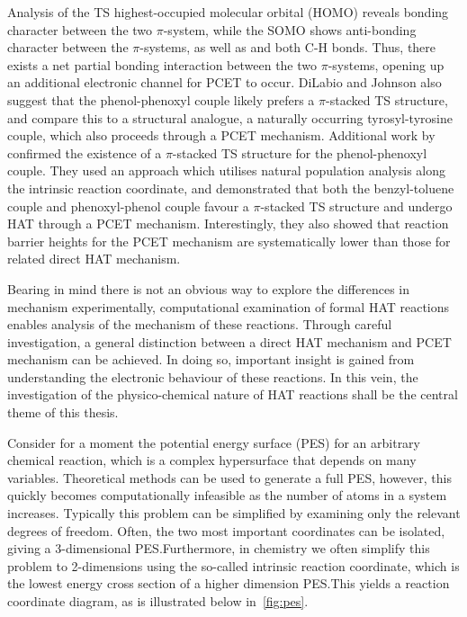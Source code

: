 Analysis of the TS highest-occupied molecular orbital (HOMO) reveals bonding character between the two $\pi$-system, while the SOMO shows anti-bonding character between the $\pi$-systems, as well as and both C-H bonds. Thus, there exists a net partial bonding interaction between the two $\pi$-systems, opening up an additional electronic channel for PCET to occur. DiLabio and Johnson also suggest that the phenol-phenoxyl couple likely prefers a $\pi$-stacked TS structure, and compare this to a structural analogue, a naturally occurring tyrosyl-tyrosine couple, which also proceeds through a PCET mechanism. Additional work by \citet{MunozRugeles2017} confirmed the existence of a $\pi$-stacked TS structure for the phenol-phenoxyl couple. They used an approach which utilises natural population analysis along the intrinsic reaction coordinate, and demonstrated that both the benzyl-toluene couple and phenoxyl-phenol couple favour a $\pi$-stacked TS structure and undergo HAT through a PCET mechanism. Interestingly, they also showed that reaction barrier heights for the PCET mechanism are systematically lower than those for related direct HAT mechanism.

Bearing in mind there is not an obvious way to explore the differences in mechanism experimentally, computational examination of formal HAT reactions enables analysis of the mechanism of these reactions. Through careful investigation, a general distinction between a direct HAT mechanism and PCET mechanism can be achieved. In doing so, important insight is gained from understanding the electronic behaviour of these reactions. In this vein, the investigation of the physico-chemical nature of HAT reactions shall be the central theme of this thesis.

Consider for a moment the potential energy surface (PES) for an arbitrary chemical reaction, which is a complex hypersurface that depends on many variables. Theoretical methods can be used to generate a full PES, however, this quickly becomes computationally infeasible as the number of atoms in a system increases. Typically this problem can be simplified by examining only the relevant degrees of freedom. Often, the two most important coordinates can be isolated, giving a 3-dimensional PES.\@ Furthermore, in chemistry we often simplify this problem to 2-dimensions using the so-called intrinsic reaction coordinate, which is the lowest energy cross section of a higher dimension PES.\@ This yields a reaction coordinate diagram, as is illustrated below in~\ref{fig:pes}.

